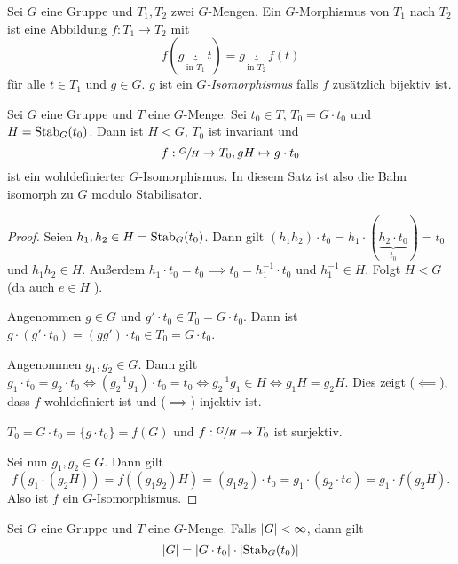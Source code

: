 \begin{definition}
	Sei $G$ eine Gruppe und $T_1, T_2$ zwei $G$-Mengen.
	Ein $G$-Morphismus von $T_1$ nach $T_2$ ist eine Abbildung $f: T_1 \to T_2$ mit
	\[
		f(g \underbrace{\cdot }_{\text{in } T_1} t) = g \underbrace{\cdot}_{\text{in } T_2} f(t)
	\]
	für alle $t \in T_1$ und $g \in G$.
	$g$ ist ein \emph{$G$-Isomorphismus} falls $f$ zusätzlich bijektiv ist.
\end{definition}

\begin{theorem}
	Sei $G$ eine Gruppe und $T$ eine $G$-Menge.
	Sei $t_0 \in T$, $T_0 = G \cdot t_0$ und $H = \operatorname{Stab}_{G}(t_0)$.
	Dann ist $H < G$, $T_0$ ist invariant und 
	\[
		f: \sfrac{G}{H} \to T_0, gH \mapsto g\cdot t_0
	\]
	ist ein wohldefinierter $G$-Isomorphismus.
	In diesem Satz ist also die Bahn isomorph zu $G$ modulo Stabilisator.
\end{theorem}

\begin{proof}
	Seien $h_1,h_2 \in H = \operatorname{Stab}_{G}(t_0)$. Dann gilt $(h_1 h_2) \cdot t_0 = h_1 \cdot (\underbrace{h_2 \cdot t_0}_{t_0}) = t_0$ und $h_1 h_2 \in H$.
	Außerdem $h_1 \cdot t_0 = t_0 \implies t_0 = h_1^{-1} \cdot t_0$ und $h_1^{-1} \in H$. Folgt $H < G$ (da auch $e \in H$ ).
	
	Angenommen $g \in G$ und $g' \cdot t_0 \in T_0 = G \cdot t_0$.
	Dann ist $g \cdot (g' \cdot t_0) = (g g') \cdot t_0 \in T_0 = G \cdot t_0$.

	Angenommen $g_1, g_2 \in G$. Dann gilt $g_1 \cdot t_0 = g_2 \cdot t_0 \Leftrightarrow (g_2^{-1} g_1) \cdot t_0 = t_0 \Leftrightarrow g_2^{-1} g_1 \in H \Leftrightarrow g_1H = g_2 H$.
	Dies zeigt ($\impliedby$), dass $f$ wohldefiniert ist und ($\implies$) injektiv ist.

	$T_0 = G \cdot t_0 = \{g \cdot t_0\}  = f(G)$ und $f: \sfrac{G}{H} \to T_0$ ist surjektiv.

	Sei nun $g_1,g_2 \in G$. Dann gilt
	\[
		f(g_1 \cdot (g_2 H)) = f((g_1 g_2) H) = (g_1 g_2) \cdot t_0 = g_1 \cdot (g_2 \cdot to) = g_1 \cdot f(g_2 H)
	.\]
	Also ist $f$ ein $G$-Isomorphismus.
\end{proof}

\begin{corollary}
	Sei $G$ eine Gruppe und $T$ eine $G$-Menge. Falls $\abs{G} < \infty$, dann gilt 
	\[
		\abs{G} = \abs{G \cdot t_0} \cdot \abs{\operatorname{Stab}_{G}(t_0)}
	\]
\end{corollary}

